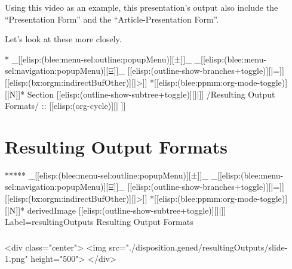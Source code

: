 \begin{whenOrg}
\begin{verblatex}
\begin{frame}[fragile,plain,label=figmmDocOutputForms]
{  Using this video as an example, this presentation's output also include
  the ``Presentation Form'' and the ``Article-Presentation Form''.

  Let's look at these more closely.

}


\end{frame}
\end{verblatex}

\begin{whenOrg}
*  _[[elisp:(blee:menu-sel:outline:popupMenu)][±]]_ _[[elisp:(blee:menu-sel:navigation:popupMenu)][Ξ]]_ [[elisp:(outline-show-branches+toggle)][|=]] [[elisp:(bx:orgm:indirectBufOther)][|>]] *[[elisp:(blee:ppmm:org-mode-toggle)][|N]]*  Section    [[elisp:(outline-show-subtree+toggle)][||]]   /Resulting Output Formats/ ::  [[elisp:(org-cycle)][| ]]
\end{whenOrg}

\section{Resulting Output Formats}

\begin{whenOrg}
*****  _[[elisp:(blee:menu-sel:outline:popupMenu)][±]]_ _[[elisp:(blee:menu-sel:navigation:popupMenu)][Ξ]]_ [[elisp:(outline-show-branches+toggle)][|=]] [[elisp:(bx:orgm:indirectBufOther)][|>]] *[[elisp:(blee:ppmm:org-mode-toggle)][|N]]*  derivedImage [[elisp:(outline-show-subtree+toggle)][||]] Label=resultingOutputs Resulting Output Formats
\end{whenOrg}

\begin{htmlonly}

\begin{frame}[fragile,plain,label=resultingOutputs]
    \frametitle{}
    \framesubtitle{}
    \begin{rawhtml}
<div class="center">
<img src="./disposition.gened/resultingOutputs/slide-1.png" height="500">
</div>
    \end{rawhtml}
\end{frame}
\end{htmlonly}


\end{whenOrg}
